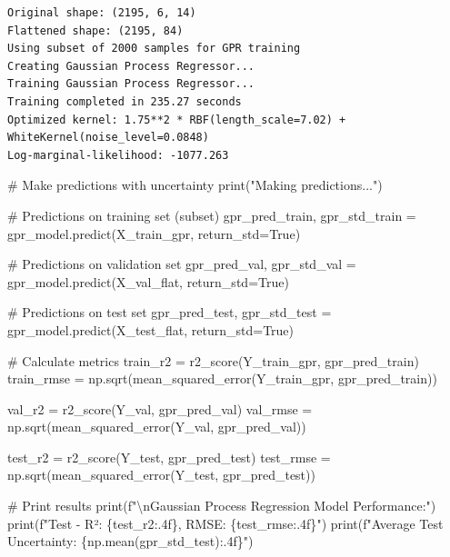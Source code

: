 \documentclass[
  letterpaper,
  DIV=11,
  numbers=noendperiod]{scrreprt}
\newenvironment{Shaded}{\begin{snugshade}}{\end{snugshade}}
\newcommand{\BuiltInTok}[1]{\textcolor[rgb]{0.00,0.23,0.31}{#1}}
\newcommand{\CharTok}[1]{\textcolor[rgb]{0.13,0.47,0.30}{#1}}
\newcommand{\CommentTok}[1]{\textcolor[rgb]{0.37,0.37,0.37}{#1}}
\newcommand{\NormalTok}[1]{\textcolor[rgb]{0.00,0.23,0.31}{#1}}
\newcommand{\OperatorTok}[1]{\textcolor[rgb]{0.37,0.37,0.37}{#1}}
\newcommand{\SpecialCharTok}[1]{\textcolor[rgb]{0.37,0.37,0.37}{#1}}
\newcommand{\SpecialStringTok}[1]{\textcolor[rgb]{0.13,0.47,0.30}{#1}}
\newcommand{\StringTok}[1]{\textcolor[rgb]{0.13,0.47,0.30}{#1}}
\newcommand{\VariableTok}[1]{\textcolor[rgb]{0.07,0.07,0.07}{#1}}
\begin{document}
\begin{verbatim}
Original shape: (2195, 6, 14)
Flattened shape: (2195, 84)
Using subset of 2000 samples for GPR training
Creating Gaussian Process Regressor...
Training Gaussian Process Regressor...
Training completed in 235.27 seconds
Optimized kernel: 1.75**2 * RBF(length_scale=7.02) + WhiteKernel(noise_level=0.0848)
Log-marginal-likelihood: -1077.263
\end{verbatim}

\begin{Shaded}
\begin{Highlighting}[]
\CommentTok{\# Make predictions with uncertainty}
\BuiltInTok{print}\NormalTok{(}\StringTok{"Making predictions..."}\NormalTok{)}

\CommentTok{\# Predictions on training set (subset)}
\NormalTok{gpr\_pred\_train, gpr\_std\_train }\OperatorTok{=}\NormalTok{ gpr\_model.predict(X\_train\_gpr, return\_std}\OperatorTok{=}\VariableTok{True}\NormalTok{)}

\CommentTok{\# Predictions on validation set}
\NormalTok{gpr\_pred\_val, gpr\_std\_val }\OperatorTok{=}\NormalTok{ gpr\_model.predict(X\_val\_flat, return\_std}\OperatorTok{=}\VariableTok{True}\NormalTok{)}

\CommentTok{\# Predictions on test set}
\NormalTok{gpr\_pred\_test, gpr\_std\_test }\OperatorTok{=}\NormalTok{ gpr\_model.predict(X\_test\_flat, return\_std}\OperatorTok{=}\VariableTok{True}\NormalTok{)}

\CommentTok{\# Calculate metrics}
\NormalTok{train\_r2 }\OperatorTok{=}\NormalTok{ r2\_score(Y\_train\_gpr, gpr\_pred\_train)}
\NormalTok{train\_rmse }\OperatorTok{=}\NormalTok{ np.sqrt(mean\_squared\_error(Y\_train\_gpr, gpr\_pred\_train))}

\NormalTok{val\_r2 }\OperatorTok{=}\NormalTok{ r2\_score(Y\_val, gpr\_pred\_val)}
\NormalTok{val\_rmse }\OperatorTok{=}\NormalTok{ np.sqrt(mean\_squared\_error(Y\_val, gpr\_pred\_val))}

\NormalTok{test\_r2 }\OperatorTok{=}\NormalTok{ r2\_score(Y\_test, gpr\_pred\_test)}
\NormalTok{test\_rmse }\OperatorTok{=}\NormalTok{ np.sqrt(mean\_squared\_error(Y\_test, gpr\_pred\_test))}

\CommentTok{\# Print results}
\BuiltInTok{print}\NormalTok{(}\SpecialStringTok{f"}\CharTok{\textbackslash{}n}\SpecialStringTok{Gaussian Process Regression Model Performance:"}\NormalTok{)}
\BuiltInTok{print}\NormalTok{(}\SpecialStringTok{f"Test {-} R²: }\SpecialCharTok{\{}\NormalTok{test\_r2}\SpecialCharTok{:.4f\}}\SpecialStringTok{, RMSE: }\SpecialCharTok{\{}\NormalTok{test\_rmse}\SpecialCharTok{:.4f\}}\SpecialStringTok{"}\NormalTok{)}
\BuiltInTok{print}\NormalTok{(}\SpecialStringTok{f"Average Test Uncertainty: }\SpecialCharTok{\{}\NormalTok{np}\SpecialCharTok{.}\NormalTok{mean(gpr\_std\_test)}\SpecialCharTok{:.4f\}}\SpecialStringTok{"}\NormalTok{)}


\end{Highlighting}
\end{Shaded}
\end{document}
